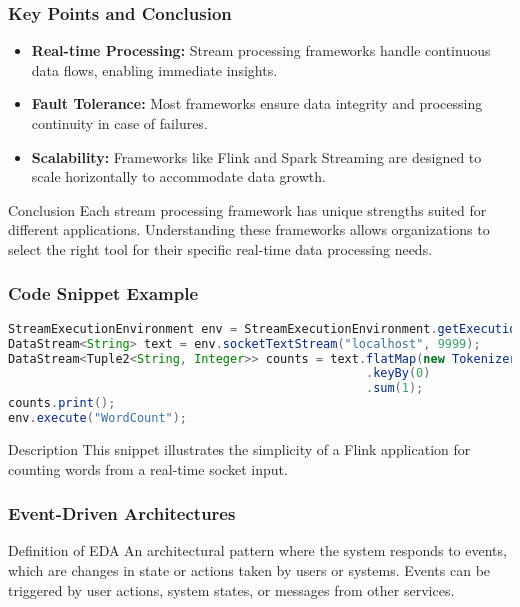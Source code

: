 \documentclass[aspectratio=169]{beamer}
\begin{document}
\begin{frame}
    \frametitle{Key Points and Conclusion}
    \begin{itemize}
        \item \textbf{Real-time Processing:} Stream processing frameworks handle continuous data flows, enabling immediate insights.
        \item \textbf{Fault Tolerance:} Most frameworks ensure data integrity and processing continuity in case of failures.
        \item \textbf{Scalability:} Frameworks like Flink and Spark Streaming are designed to scale horizontally to accommodate data growth.
    \end{itemize}
    
    \begin{block}{Conclusion}
        Each stream processing framework has unique strengths suited for different applications. Understanding these frameworks allows organizations to select the right tool for their specific real-time data processing needs.
    \end{block}
\end{frame}

\begin{frame}[fragile]
    \frametitle{Code Snippet Example}
    \begin{lstlisting}[language=Java]
StreamExecutionEnvironment env = StreamExecutionEnvironment.getExecutionEnvironment();
DataStream<String> text = env.socketTextStream("localhost", 9999);
DataStream<Tuple2<String, Integer>> counts = text.flatMap(new Tokenizer())
                                                  .keyBy(0)
                                                  .sum(1);
counts.print();
env.execute("WordCount");
    \end{lstlisting}
    \begin{block}{Description}
        This snippet illustrates the simplicity of a Flink application for counting words from a real-time socket input.
    \end{block}
\end{frame}

\begin{frame}[fragile]
    \frametitle{Event-Driven Architectures}
    \begin{block}{Definition of EDA}
        An architectural pattern where the system responds to events, which are changes in state or actions taken by users or systems.
        Events can be triggered by user actions, system states, or messages from other services.
    \end{block}
\end{frame}
\end{document}
